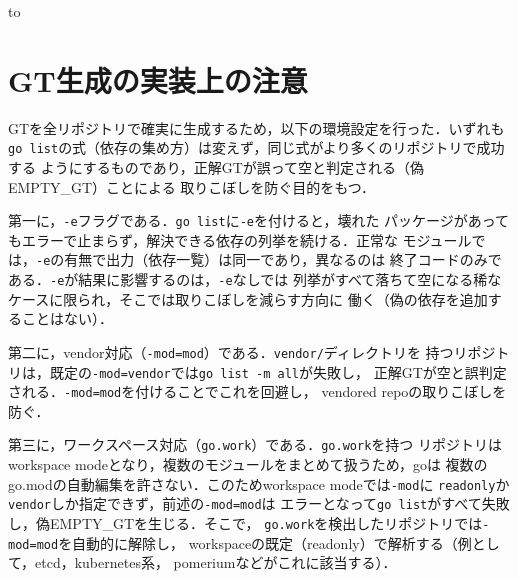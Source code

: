 \documentclass{css}
\def\|{\verb|}
\begin{document}
\begin{table}[tb]
\caption{FP要因バケツ（imported基準・name，\%）}
\label{tab:fp}
\hbox to
\end{table}

%% ------------------------------------------------------------
\section{GT生成の実装上の注意}
\label{app:gtimpl}
%% ------------------------------------------------------------
GTを全リポジトリで確実に生成するため，以下の環境設定を行った．いずれも
\|go list|の式（依存の集め方）は変えず，同じ式がより多くのリポジトリで成功する
ようにするものであり，正解GTが誤って空と判定される（偽EMPTY\_GT）ことによる
取りこぼしを防ぐ目的をもつ．

第一に，\texttt{-e}フラグである．\|go list|に\texttt{-e}を付けると，壊れた
パッケージがあってもエラーで止まらず，解決できる依存の列挙を続ける．正常な
モジュールでは，\texttt{-e}の有無で出力（依存一覧）は同一であり，異なるのは
終了コードのみである．\texttt{-e}が結果に影響するのは，\texttt{-e}なしでは
列挙がすべて落ちて空になる稀なケースに限られ，そこでは取りこぼしを減らす方向に
働く（偽の依存を追加することはない）．

第二に，vendor対応（\texttt{-mod=mod}）である．\texttt{vendor/}ディレクトリを
持つリポジトリは，既定の\texttt{-mod=vendor}では\|go list -m all|が失敗し，
正解GTが空と誤判定される．\texttt{-mod=mod}を付けることでこれを回避し，
vendored repoの取りこぼしを防ぐ．

第三に，ワークスペース対応（\texttt{go.work}）である．\texttt{go.work}を持つ
リポジトリはworkspace modeとなり，複数のモジュールをまとめて扱うため，goは
複数のgo.modの自動編集を許さない．このためworkspace modeでは\texttt{-mod}に
\texttt{readonly}か\texttt{vendor}しか指定できず，前述の\texttt{-mod=mod}は
エラーとなって\|go list|がすべて失敗し，偽EMPTY\_GTを生じる．そこで，
\texttt{go.work}を検出したリポジトリでは\texttt{-mod=mod}を自動的に解除し，
workspaceの既定（readonly）で解析する（例として，etcd，kubernetes系，
pomeriumなどがこれに該当する）．
\end{document}
